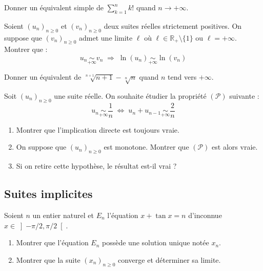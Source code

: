 \documentclass[a4paper,twoside,french,11pt]{VcCours}
\begin{document}
\begin{Exercice}[$\bigstar$]
  Donner un équivalent simple de $\sum_{k=1}^n k!$ quand $n \rightarrow + \infty$.
\end{Exercice} 


\begin{Exercice} Soient $(u_n)_{n \geq 0}$ et $(v_n)_{n \geq 0}$ deux suites réelles strictement positives. On suppose que $(v_n)_{n \geq 0}$ admet une limite $\ell$ où $\ell \in \mathbb{R}_+\setminus \lbrace 1 \rbrace$ ou $\ell= + \infty$. Montrer que :
$$ u_n \underset{+ \infty}{\sim} v_n \; \Longrightarrow  \; \ln(u_n) \underset{+\infty}{\sim} \ln(v_n)$$
\end{Exercice}


\begin{Exercice}[$\bigstar$]
  Donner un équivalent de $\sqrt[n+1]{n+1}-\sqrt[n]{n}$ quand $n$ tend vers $+\infty$.
\end{Exercice} 


\begin{Exercice}[$\bigstar$]
  Soit $(u_n)_{n \geq 0}$ une suite réelle. On souhaite étudier la propriété 
  $(\mathcal{P})$ suivante :
$$ u_n \underset{+ \infty}{\sim} \dfrac{1}{n} \; \Longleftrightarrow \; u_n + u_{n-1} 
\underset{+ \infty}{\sim} \dfrac{2}{n}$$
\begin{enumerate}
\item Montrer que l'implication directe est toujours vraie.
\item On suppose que $(u_n)_{n \geq 0}$ est monotone. Montrer que $(\mathcal{P})$ est alors vraie.
\item Si on retire cette hypothèse, le résultat est-il vrai ?
\end{enumerate}
\end{Exercice}


\subsection{Suites implicites}

\begin{Exercice} Soient $n$ un entier naturel et $E_n $ l'équation $x + \tan x = n$ d'inconnue $x \in \left] { - \pi  / 2,\pi  / 2} \right[$.

\begin{enumerate}
\item Montrer que l'équation $E_n$ possède une solution unique notée $x_n$.
\item Montrer que la suite $(x_n)_{n \geq 0}$ converge et déterminer sa limite.
\end{enumerate}
\end{Exercice} 
\end{document}
